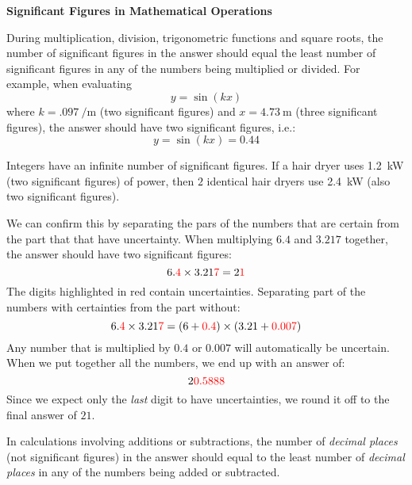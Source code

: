 \documentclass{../../oss-handout}
\begin{document}
\begin{center}
  \textbf{Significant Figures in Mathematical Operations}
\end{center}
During multiplication, division, trigonometric functions and square roots, the
number of significant figures in the answer should equal the least number of
significant figures in any of the numbers being multiplied or divided. For
example, when evaluating
\begin{equation*}
  y=\sin(kx)
\end{equation*}
where $k=\SI{.097}{\per\metre}$ (two significant figures) and
$x=\SI{4.73}{\metre}$ (three significant figures), the answer should have two
significant figures, i.e.:
\begin{displaymath}
  y=\sin(kx)=0.44
\end{displaymath}

Integers have an infinite number of significant figures. If a hair dryer uses
\SI{1.2}{\kilo\watt} (two significant figures) of power, then $2$ identical
hair dryers use \SI{2.4}{\kilo\watt} (also two significant figures).

We can confirm this by separating the pars of the numbers that are certain from
the part that that have uncertainty. When multiplying $6.4$ and $3.217$
together, the answer should have two significant figures:
\begin{equation*}
  6.\textcolor{red}{4}\times 3.21\textcolor{red}{7}=2\textcolor{red}{1}
\end{equation*}
The digits highlighted in red contain uncertainties. Separating part of the
numbers with certainties from the part without:
\begin{equation*}
    6.\textcolor{red}{4}\times 3.21\textcolor{red}{7}
    = (6+\textcolor{red}{0.4}) \times (3.21 + \textcolor{red}{0.007})
\end{equation*}
Any number that is multiplied by $0.4$ or $0.007$ will automatically be
uncertain. When we put together all the numbers, we end up with an answer of:
\begin{equation*}
  2\textcolor{red}{0.5888}
\end{equation*}
Since we expect only the \emph{last} digit to have uncertainties, we round it
off to the final answer of $21$.

In calculations involving additions or subtractions, the number of
\emph{decimal places} (not significant figures) in the answer should equal
to the least number of \emph{decimal places} in any of the numbers being
added or subtracted.
\end{document}
